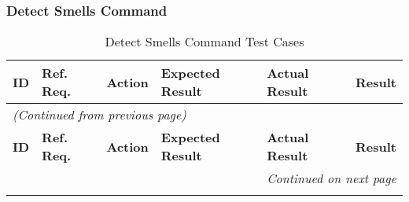\documentclass[12pt, titlepage]{article}
\begin{document}
\subsubsection{Detect Smells Command}

\begin{longtable}{c 
  >{\raggedright\arraybackslash}p{1.5cm} 
  >{\raggedright\arraybackslash}p{4.5cm} 
  >{\raggedright\arraybackslash}p{4cm} 
  >{\raggedright\arraybackslash}p{3cm} c}
  \toprule
  \textbf{ID} & \textbf{Ref. Req.} & \textbf{Action} & \textbf{Expected Result} & \textbf{Actual Result} & \textbf{Result} \\ 
  \midrule
  \endfirsthead

  \multicolumn{6}{l}{\textit{(Continued from previous page)}} \\ 
  \toprule
  \textbf{ID} & \textbf{Ref. Req.} & \textbf{Action} & \textbf{Expected Result} & \textbf{Actual Result} & \textbf{Result} \\ 
  \midrule
  \endhead

  \multicolumn{6}{r}{\textit{Continued on next page}} \\
  \endfoot

  \bottomrule
  \caption{Detect Smells Command Test Cases}
  \label{table:plugin_detect_command_tests}
  \endlastfoot


\end{longtable}
\end{document}
